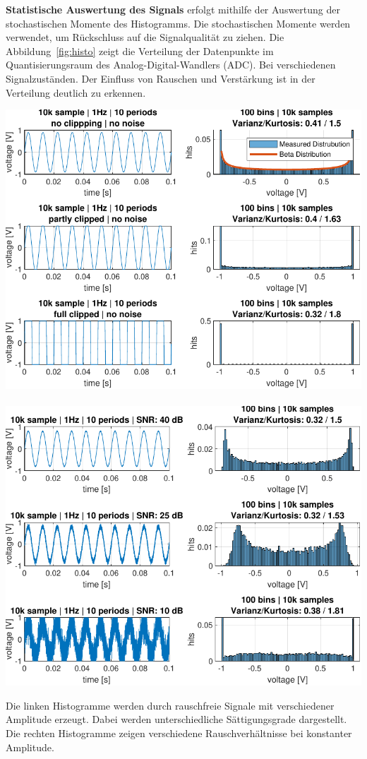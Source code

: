 \begin{multicols}{2}
			\begin{mdboxshad}
				{\textbf{Statistische Auswertung des Signals} erfolgt mithilfe der Auswertung der stochastischen Momente des Histogramms. Die stochastischen Momente werden verwendet, um Rückschluss auf die Signalqualität zu ziehen.
				Die Abbildung~\ref{fig:histo} zeigt die Verteilung der Datenpunkte im Quantisierungsraum des Analog-Digital-Wandlers (ADC). Bei verschiedenen Signalzuständen. Der Einfluss von Rauschen und Verstärkung ist  in der Verteilung deutlich zu erkennen.}
				\hspace*{2mm}
				\begin{center}
					\begin{figurehere}
						\includegraphics[width=0.45\columnwidth]{../../img/beta-distribution}~~~~~
						\includegraphics[width=0.45\columnwidth]{../../img/noise-histogramm}
						\caption{Die linken Histogramme werden durch rauschfreie Signale mit verschiedener Amplitude erzeugt. Dabei werden unterschiedliche Sättigungsgrade dargestellt. Die rechten Histogramme zeigen verschiedene Rauschverhältnisse bei konstanter Amplitude.}
						\label{fig:histo}	 
					\end{figurehere}
				\end{center}


\end{mdboxshad}
\end{multicols}
